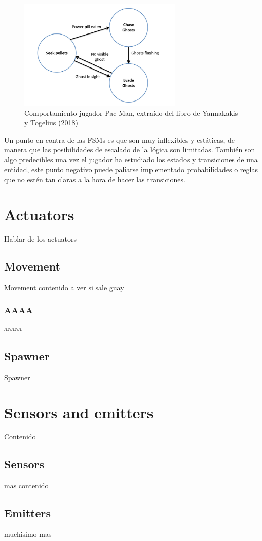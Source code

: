 \begin{figure}[t]
	\centering
	\includegraphics[width = 0.7\textwidth]{Imagenes/FMS_MsPac-man.png}
	\caption{Comportamiento jugador Pac-Man, extraído del libro de Yannakakis y Togelius (2018)}
	\label{fig:Comportamiento jugador Pac-Man}
\end{figure}

Un punto en contra de las FSMs es que son muy inflexibles y estáticas, de manera que las posibilidades de escalado de la lógica son limitadas. También son algo predecibles una vez el jugador ha estudiado los estados y transiciones de una entidad, este punto negativo puede paliarse implementado probabilidades o reglas que no estén tan claras a la hora de hacer las transiciones.

\section{Actuators}
Hablar de los actuators
\subsection{Movement}
Movement contenido a ver si sale guay
\subsubsection{AAAA}
aaaaa
\subsection{Spawner}
Spawner
\section{Sensors and emitters}
Contenido
\subsection{Sensors}
mas contenido
\subsection{Emitters}
muchisimo mas
